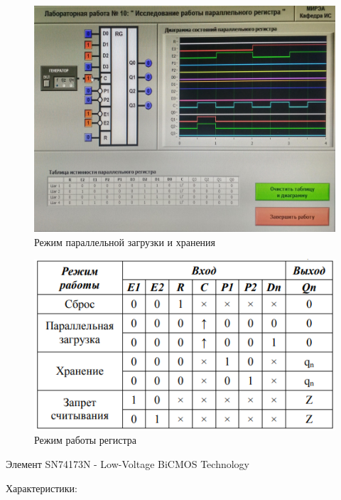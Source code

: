 \begin{figure}[H]
	\centering
	\includegraphics[width=0.95\linewidth]{imgs/10/2.jpg}
	\caption{Режим параллельной загрузки и хранения}
	\label{fig:10_2}
\end{figure}



\begin{figure}[H]
	\centering
	\includegraphics[width=0.95\linewidth]{imgs/10/10_tab}
	\caption{Режим работы регистра}
	\label{fig:10_tab}
\end{figure}

Элемент SN74173N - Low-Voltage BiCMOS Technology

Характеристики:

